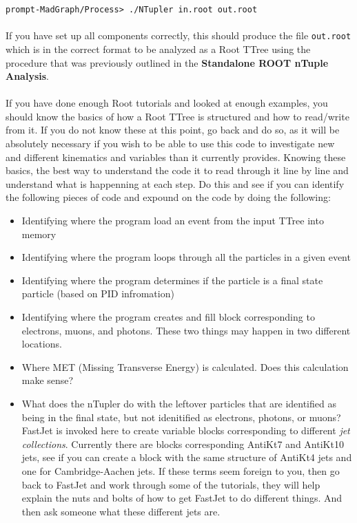 \documentclass[12pt]{article}
\begin{document}
\texttt{prompt-MadGraph/Process> ./NTupler in.root out.root}\\
\\
If you have set up all components correctly, this should produce the file \texttt{out.root} which is in the correct format to be analyzed as a Root TTree using the procedure that was previously outlined in the \textbf{Standalone ROOT nTuple Analysis}.\\
\\
If you have done enough Root tutorials and looked at enough examples, you should know the basics of how a Root TTree is structured and how to read/write from it.  If you do not know these at this point, go back and do so, as it will be absolutely necessary if you wish to be able to use this code to investigate new and different kinematics and variables than it currently provides.  Knowing these basics, the best way to understand the code it to read through it line by line and understand what is happenning at each step.  Do this and see if you can identify the following pieces of code and expound on the code by doing the following:
\begin{itemize}
\item Identifying where the program load an event from the input TTree into memory
\item Identifying where the program loops through all the particles in a given event
\item Identifying where the program determines if the particle is a final state particle (based on PID infromation)
\item Identifying where the program creates and fill block corresponding to electrons, muons, and photons.  These two things may happen in two different locations.
\item Where MET (Missing Transverse Energy) is calculated.  Does this calculation make sense?
\item What does the nTupler do with the leftover particles that are identified as being in the final state, but not idenitified as electrons, photons, or muons?  FastJet is invoked here to create variable blocks corresponding to different \textit{jet collections}.  Currently there are blocks corresponding AntiKt7 and AntiKt10 jets, see if you can create a block with the same structure of AntiKt4 jets and one for Cambridge-Aachen jets.  If these terms seem foreign to you, then go back to FastJet and work through some of the tutorials, they will help explain the nuts and bolts of how to get FastJet to do different things.  And then ask someone what these different jets are.
\end{itemize}
\end{document}

